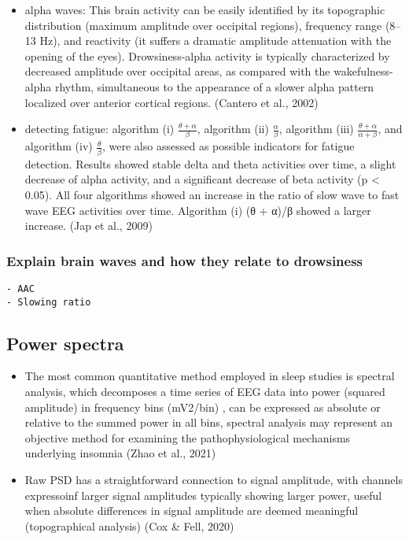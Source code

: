 \documentclass[
]{article}
\providecommand{\tightlist}{%
  \setlength{\itemsep}{0pt}\setlength{\parskip}{0pt}}
\begin{document}
\begin{itemize}
\item
  alpha waves: This brain activity can be easily identified by its
  topographic distribution (maximum amplitude over occipital regions),
  frequency range (8--13 Hz), and reactivity (it suffers a dramatic
  amplitude attenuation with the opening of the eyes). Drowsiness-alpha
  activity is typically characterized by decreased amplitude over
  occipital areas, as compared with the wakefulness-alpha rhythm,
  simultaneous to the appearance of a slower alpha pattern localized
  over anterior cortical regions. (Cantero et al., 2002)
\item
  detecting fatigue: algorithm (i) \(\frac {\theta + \alpha}{\beta}\),
  algorithm (ii) \(\frac {\alpha}{\beta}\), algorithm (iii)
  \(\frac {\theta + \alpha} {\alpha + \beta}\), and algorithm (iv)
  \(\frac {\theta}{\beta}\), were also assessed as possible indicators
  for fatigue detection. Results showed stable delta and theta
  activities over time, a slight decrease of alpha activity, and a
  significant decrease of beta activity (p \textless{} 0.05). All four
  algorithms showed an increase in the ratio of slow wave to fast wave
  EEG activities over time. Algorithm (i) (θ + α)/β showed a larger
  increase. (Jap et al., 2009)
\end{itemize}

\subsubsection{Explain brain waves and how they relate to
drowsiness}\label{explain-brain-waves-and-how-they-relate-to-drowsiness}

\begin{verbatim}
- AAC
- Slowing ratio
\end{verbatim}

\subsection{Power spectra}\label{power-spectra}

\begin{itemize}
\tightlist
\item
  The most common quantitative method employed in sleep studies is
  spectral analysis, which decomposes a time series of EEG data into
  power (squared amplitude) in frequency bins (mV2/bin) , can be
  expressed as absolute or relative to the summed power in all bins,
  spectral analysis may represent an objective method for examining the
  pathophysiological mechanisms underlying insomnia (Zhao et al., 2021)
\item
  Raw PSD has a straightforward connection to signal amplitude, with
  channels expressoinf larger signal amplitudes typically showing larger
  power, useful when absolute differences in signal amplitude are deemed
  meaningful (topographical analysis) (Cox \& Fell, 2020)
\end{itemize}
\end{document}
